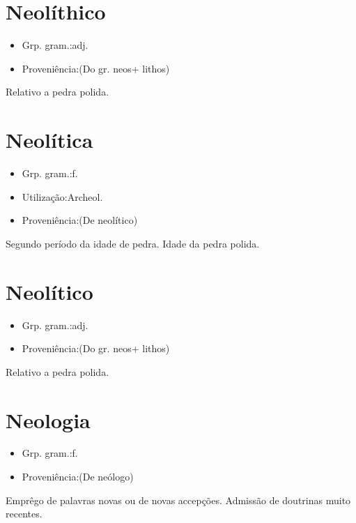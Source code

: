 \section{Neolíthico}
\begin{itemize}
\item {Grp. gram.:adj.}
\end{itemize}
\begin{itemize}
\item {Proveniência:(Do gr. \textunderscore neos\textunderscore  + \textunderscore lithos\textunderscore )}
\end{itemize}
Relativo a pedra polida.
\section{Neolítica}
\begin{itemize}
\item {Grp. gram.:f.}
\end{itemize}
\begin{itemize}
\item {Utilização:Archeol.}
\end{itemize}
\begin{itemize}
\item {Proveniência:(De \textunderscore neolítico\textunderscore )}
\end{itemize}
Segundo período da idade de pedra.
Idade da pedra polida.
\section{Neolítico}
\begin{itemize}
\item {Grp. gram.:adj.}
\end{itemize}
\begin{itemize}
\item {Proveniência:(Do gr. \textunderscore neos\textunderscore  + \textunderscore lithos\textunderscore )}
\end{itemize}
Relativo a pedra polida.
\section{Neologia}
\begin{itemize}
\item {Grp. gram.:f.}
\end{itemize}
\begin{itemize}
\item {Proveniência:(De \textunderscore neólogo\textunderscore )}
\end{itemize}
Emprêgo de palavras novas ou de novas accepções.
Admissão de doutrinas muito recentes.
